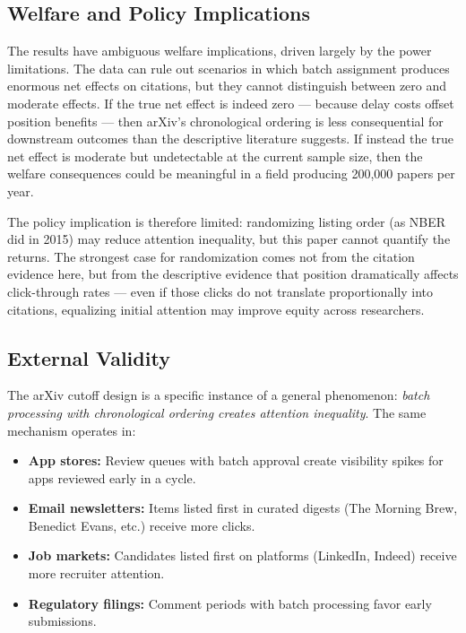 \documentclass[12pt]{article}
\begin{document}
\subsection{Welfare and Policy Implications}

The results have ambiguous welfare implications, driven largely by the power limitations. The data can rule out scenarios in which batch assignment produces enormous net effects on citations, but they cannot distinguish between zero and moderate effects. If the true net effect is indeed zero --- because delay costs offset position benefits --- then arXiv's chronological ordering is less consequential for downstream outcomes than the descriptive literature suggests. If instead the true net effect is moderate but undetectable at the current sample size, then the welfare consequences could be meaningful in a field producing 200,000 papers per year.

The policy implication is therefore limited: randomizing listing order (as NBER did in 2015) may reduce attention inequality, but this paper cannot quantify the returns. The strongest case for randomization comes not from the citation evidence here, but from the descriptive evidence that position dramatically affects click-through rates \citep{haque2009} --- even if those clicks do not translate proportionally into citations, equalizing initial attention may improve equity across researchers.

\subsection{External Validity}

The arXiv cutoff design is a specific instance of a general phenomenon: \textit{batch processing with chronological ordering creates attention inequality}. The same mechanism operates in:

\begin{itemize}
\item \textbf{App stores:} Review queues with batch approval create visibility spikes for apps reviewed early in a cycle.
\item \textbf{Email newsletters:} Items listed first in curated digests (The Morning Brew, Benedict Evans, etc.) receive more clicks.
\item \textbf{Job markets:} Candidates listed first on platforms (LinkedIn, Indeed) receive more recruiter attention.
\item \textbf{Regulatory filings:} Comment periods with batch processing favor early submissions.
\end{itemize}
\end{document}
